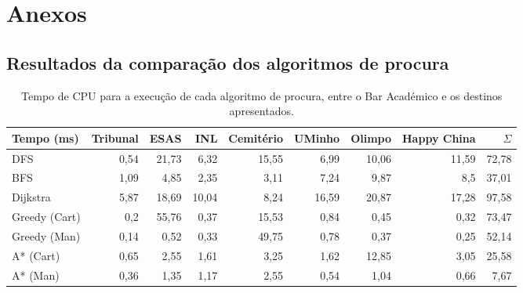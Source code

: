 \documentclass[12pt, a4paper]{article}
\begin{document}
\section{Anexos}

\subsection{Resultados da comparação dos algoritmos de procura}
\label{comparison-data}

\begin{table}[H]
    \small

    \begin{adjustwidth}{-1.5cm}{-1.5cm}
        \begin{center}
            \begin{tabular}{|l|r|r|r|r|r|r|r|r|}
                \hline
                    Tempo (ms)  &
                    Tribunal    &
                    ESAS        &
                    INL         &
                    Cemitério   &
                    UMinho      &
                    Olimpo      &
                    Happy China &
                    $\Sigma$    \\

                \hline
                DFS & 0,54 & 21,73 & 6,32 & 15,55 & 6,99 & 10,06 & 11,59 & 72,78 \\
                \hline
                BFS & 1,09 & 4,85 & 2,35 & 3,11 & 7,24 & 9,87 & 8,5 & 37,01 \\
                \hline
                Dijkstra & 5,87 & 18,69 & 10,04 & 8,24 & 16,59 & 20,87 & 17,28 & 97,58 \\
                \hline
                Greedy (Cart) & 0,2 & 55,76 & 0,37 & 15,53 & 0,84 & 0,45 & 0,32 & 73,47 \\
                \hline
                Greedy (Man) & 0,14 & 0,52 & 0,33 & 49,75 & 0,78 & 0,37 & 0,25 & 52,14 \\
                \hline
                A* (Cart) & 0,65 & 2,55 & 1,61 & 3,25 & 1,62 & 12,85 & 3,05 & 25,58 \\
                \hline
                A* (Man) & 0,36 & 1,35 & 1,17 & 2,55 & 0,54 & 1,04 & 0,66 & 7,67 \\
                \hline
            \end{tabular}
        \end{center}
    \end{adjustwidth}

    \caption{
        Tempo de CPU para a execução de cada algoritmo de procura, entre o Bar Académico e os
        destinos apresentados.
    }
\end{table}
\end{document}
